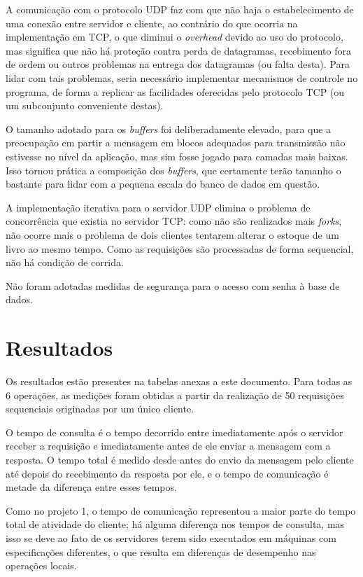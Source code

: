 \documentclass[11pt, brazil]{article} %
\begin{document}
A comunicação com o protocolo UDP faz com que não haja o estabelecimento de uma conexão entre servidor e cliente, ao contrário do que ocorria na implementação em TCP, o que diminui o \emph{overhead} devido ao uso do protocolo, mas significa que não há proteção contra perda de datagramas, recebimento fora de ordem ou outros problemas na entrega dos datagramas (ou falta desta). Para lidar com tais problemas, seria necessário implementar mecanismos de controle no programa, de forma a replicar as facilidades oferecidas pelo protocolo TCP (ou um subconjunto conveniente destas).

O tamanho adotado para os \emph{buffers} foi deliberadamente elevado, para que a preocupação em partir a mensagem em blocos adequados para transmissão não estivesse no nível da aplicação, mas sim fosse jogado para camadas mais baixas. Isso tornou prática a composição dos \emph{buffers}, que certamente terão tamanho o bastante para lidar com a pequena escala do banco de dados em questão.

A implementação iterativa para o servidor UDP elimina o problema de concorrência que existia no servidor TCP: como não são realizados mais \emph{forks}, não ocorre mais o problema de dois clientes tentarem alterar o estoque de um livro ao mesmo tempo.
Como as requisições são processadas de forma sequencial, não há condição de corrida.

Não foram adotadas medidas de segurança para o acesso com senha à base de dados.

\section{Resultados}

Os resultados estão presentes na tabelas anexas a este documento. Para todas as 6 operações,
as medições foram obtidas a partir da realização de 50 requisições sequenciais originadas
por um único cliente.

O tempo de consulta é o tempo decorrido entre imediatamente após o servidor receber a requisição e imediatamente antes de ele enviar a mensagem com a resposta. O tempo total é medido desde antes do envio da mensagem pelo cliente até depois do recebimento da resposta por ele, e o tempo de comunicação é metade da diferença entre esses tempos.

Como no projeto 1, o tempo de comunicação representou a maior parte do tempo total de atividade do cliente; há alguma diferença nos tempos de consulta, mas isso se deve ao fato de os servidores terem sido executados em máquinas com especificações diferentes, o que resulta em diferenças de desempenho nas operações locais.
\end{document}
